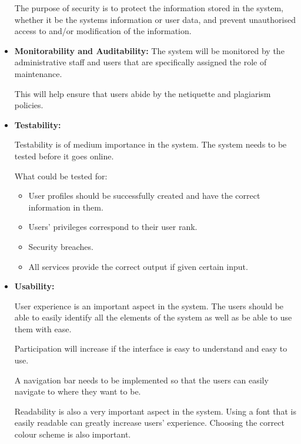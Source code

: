 \begin{flushleft}
\begin{itemize}
The purpose of security is to protect the information stored in the system, whether it be the systems information or user data, and prevent unauthorised access to and/or modification of the information.
\newline
 
		\item \textbf{Monitorability and Auditability:} 
The system will be monitored by the administrative staff and users that are specifically assigned the role of maintenance. \newline

This will help ensure that users abide by the netiquette and plagiarism policies.  \newline
			
		\item \textbf{Testability:} 
		
		Testability is of medium importance in the system. The system needs to be tested before it goes online. \newline
		
		What could be tested for:
		\begin{itemize}
		\item User profiles should be successfully created and have the correct information in them.
		\item Users’ privileges correspond to their user rank.
		\item Security breaches.
		\item All services provide the correct output if given certain input.
		\end{itemize}
		
		\item \textbf{Usability:} 
		
		User experience is an important aspect in the system. The users should be able to easily identify all the elements of the system as well as be able to use them with ease. \newline
		
		Participation will increase if the interface is easy to understand and easy to use. \newline
		
		A navigation bar needs to be implemented so that the users can easily navigate to where they want to be. \newline
		
		Readability is also a very important aspect in the system. Using a font that is easily readable can greatly increase users’ experience. Choosing the correct colour scheme is also important. \newline
		

\end{itemize}
\end{flushleft}

